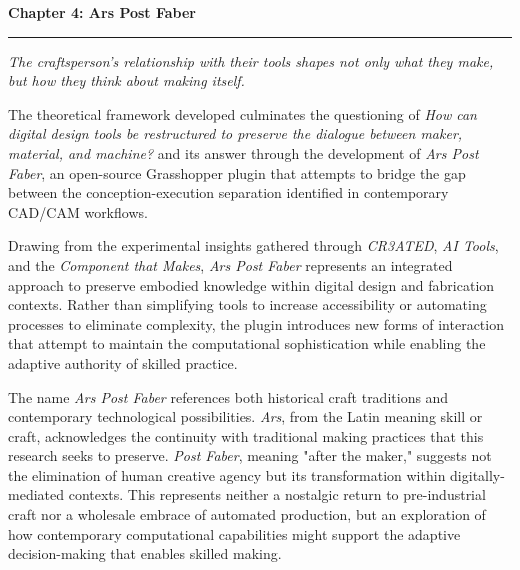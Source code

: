 \clearpage


\setcounter{chapter}{4}
\setcounter{section}{0}


\pagestyle{fancy}
\fancyhf{} 
\fancyfoot[C]{\thepage} 
\renewcommand{\headrulewidth}{0pt}
\renewcommand{\footrulewidth}{0pt}

\noindent
{\Large\textbf{Chapter 4: Ars Post Faber}}
\vspace{0.3cm}
\hrule
\vspace{0.8cm}
\label{ch:ArsPostFaber}

\setlength{\parindent}{0pt}

\textit{The craftsperson's relationship with their tools shapes not only what they make, but how they think about making itself.}

\vspace{0.5cm}

The theoretical framework developed culminates the questioning of \textit{How can digital design tools be restructured to preserve the dialogue between maker, material, and machine?} and its answer through the development of \textit{Ars Post Faber}, an open-source Grasshopper plugin that attempts to bridge the gap between the conception-execution separation identified in contemporary CAD/CAM workflows.

\vspace{0.5cm}

Drawing from the experimental insights gathered through \textit{CR3ATED}, \textit{AI Tools}, and the \textit{Component that Makes}, \textit{Ars Post Faber} represents an integrated approach to preserve embodied knowledge within digital design and fabrication contexts. Rather than simplifying tools to increase accessibility or automating processes to eliminate complexity, the plugin introduces new forms of interaction that attempt to maintain the computational sophistication while enabling the adaptive authority of skilled practice.

\vspace{0.5cm}

The name \textit{Ars Post Faber} references both historical craft traditions and contemporary technological possibilities. \textit{Ars}, from the Latin meaning skill or craft, acknowledges the continuity with traditional making practices that this research seeks to preserve. \textit{Post Faber}, meaning "after the maker," suggests not the elimination of human creative agency but its transformation within digitally-mediated contexts. This represents neither a nostalgic return to pre-industrial craft nor a wholesale embrace of automated production, but an exploration of how contemporary computational capabilities might support the adaptive decision-making that enables skilled making.

